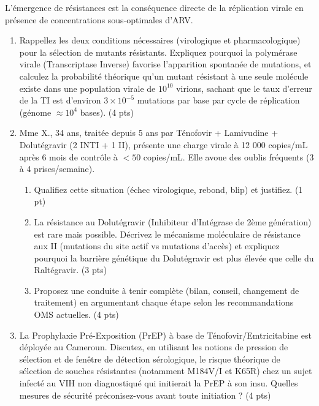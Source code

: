 \documentclass[11pt]{article}
\begin{document}
\begin{exercice}
L'émergence de résistances est la conséquence directe de la réplication virale en présence de concentrations sous-optimales d'ARV.
\begin{enumerate}
    \item Rappellez les deux conditions nécessaires (virologique et pharmacologique) pour la sélection de mutants résistants. Expliquez pourquoi la polymérase virale (Transcriptase Inverse) favorise l'apparition spontanée de mutations, et calculez la probabilité théorique qu'un mutant résistant à une seule molécule existe dans une population virale de $10^{10}$ virions, sachant que le taux d'erreur de la TI est d'environ $3 \times 10^{-5}$ mutations par base par cycle de réplication (génome $\approx 10^4$ bases). (4 pts)
    \item Mme X., 34 ans, traitée depuis 5 ans par Ténofovir + Lamivudine + Dolutégravir (2 INTI + 1 II), présente une charge virale à 12 000 copies/mL après 6 mois de contrôle à $< 50$ copies/mL. Elle avoue des oublis fréquents (3 à 4 prises/semaine).
    \begin{enumerate}
        \item Qualifiez cette situation (échec virologique, rebond, blip) et justifiez. (1 pt)
        \item La résistance au Dolutégravir (Inhibiteur d'Intégrase de 2ème génération) est rare mais possible. Décrivez le mécanisme moléculaire de résistance aux II (mutations du site actif vs mutations d'accès) et expliquez pourquoi la barrière génétique du Dolutégravir est plus élevée que celle du Raltégravir. (3 pts)
        \item Proposez une conduite à tenir complète (bilan, conseil, changement de traitement) en argumentant chaque étape selon les recommandations OMS actuelles. (4 pts)
    \end{enumerate}
    \item La Prophylaxie Pré-Exposition (PrEP) à base de Ténofovir/Emtricitabine est déployée au Cameroun. Discutez, en utilisant les notions de pression de sélection et de fenêtre de détection sérologique, le risque théorique de sélection de souches résistantes (notamment M184V/I et K65R) chez un sujet infecté au VIH non diagnostiqué qui initierait la PrEP à son insu. Quelles mesures de sécurité préconisez-vous avant toute initiation ? (4 pts)
\end{enumerate}
\end{exercice}
\end{document}
